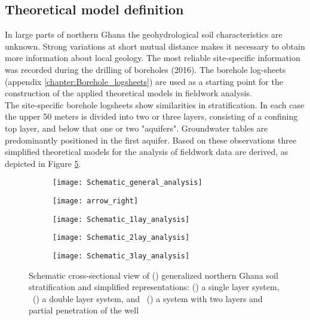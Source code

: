 \subsection{Theoretical model definition}
In large parts of northern Ghana the geohydrological soil characteristics are unknown. Strong variations at short mutual distance makes it necessary to obtain more information about local geology. The most reliable site-specific information was recorded during the drilling of boreholes (2016). The borehole log-sheets (appendix \ref{chapter:Borehole_logsheets}) are used as a starting point for the construction of the applied theoretical models in fieldwork analysis. 
\\

The site-specific borehole logsheets show similarities in stratification. In each case the upper 50 meters is divided into two or three layers, consisting of a confining top layer, and below that one or two "aquifers". Groundwater tables are predominantly positioned in the first aquifer. Based on these observations three simplified theoretical models for the analysis of fieldwork data are derived, as depicted in Figure \ref{fig:schematic_fieldwork_analysis}. 

\begin{figure}[h!]
	\centering
	\begin{subfigure}[b]{0.21\linewidth}
		\centering\texttt{[image: Schematic\_general\_analysis]}
		\captionsetup{justification=centering}		
		\caption{\label{fig:Schematic_general_analysis}}
		\end{subfigure}%
	\begin{subfigure}[b]{0.12\linewidth}
		\centering\texttt{[image: arrow\_right]}
		\end{subfigure}%
	\begin{subfigure}[b]{0.21\linewidth}
		\centering\texttt{[image: Schematic\_1lay\_analysis]}
		\captionsetup{justification=centering}		
		\caption{\label{fig:Schematic_1lay_analysis}}
		\end{subfigure}%
	\begin{subfigure}[b]{0.21\linewidth}
        \centering\texttt{[image: Schematic\_2lay\_analysis]}
		\captionsetup{justification=centering}		
		\caption{\label{fig:Schematic_2lay_analysis}}
		\end{subfigure}
	\begin{subfigure}[b]{0.21\linewidth}
        \centering\texttt{[image: Schematic\_3lay\_analysis]}
		\captionsetup{justification=centering}		
		\caption{\label{fig:Schematic_3lay_analysis}}
		\end{subfigure}
	\captionsetup{justification=centering}	
	\caption{Schematic cross-sectional view of () generalized northern Ghana soil stratification and simplified representations: () a single layer system, ~() a double layer system, and ~() a system with two layers and partial penetration of the well} 
	\label{fig:schematic_fieldwork_analysis}
\end{figure} 

